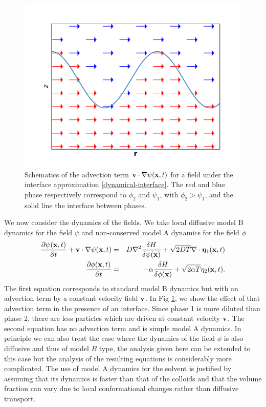 \begin{figure}
    \centering
    \includegraphics[width=0.7\linewidth]{drivenC/driven.pdf}
    \caption{Schematics of the advection term ${\bf v}\cdot { \nabla}\psi({\bf x},t)$ for a field under the interface approximation \eqref{dynamical-interface}. The red and blue phase respectively correspond to $\phi_2$ and $\psi_1$, with $\phi_2 \greater \psi_1$, and the solid line the interface between phases.}
    \label{fig-driven}    
\end{figure}

We now consider the dynamics of the fields. We take local diffusive model B dynamics for the field $\psi$ and non-conserved model A dynamics for the field $\phi$
\begin{eqnarray}
\frac{\partial \psi({\bf x},t)}{\partial t} +{\bf v}\cdot { \nabla}\psi({\bf x},t)&=& D\nabla^2\frac{\delta H}{\delta \psi({\bf x})}+ \sqrt{2D T}\nabla \cdot {\bm \eta}_1({\bf x},t) \\
\frac{\partial \phi({\bf x},t)}{\partial t} &=& -\alpha\frac{\delta H}{\delta \phi({\bf x})}+ \sqrt{2\alpha T}{ \eta}_2({\bf x},t).
\end{eqnarray}
The first equation corresponds to standard model B dynamics but with an advection term by a constant velocity field $\bf v$. 
{\color{red} In Fig \ref{fig-driven}, we show the effect of that advection term in the presence of an interface. Since phase 1 is more diluted than phase 2, there are less particles which are driven at constant velocity ${\bf v}$.}
The second equation has no advection term and is simple model A dynamics. In principle we can also treat the case where the dynamics of the field $\phi$ is also diffusive and thus of model $B$ type, the analysis given here can be extended to this case but the analysis of the resulting equations is considerably more complicated. The use of model A dynamics for the solvent is justified by assuming that its dynamics is faster than that of the colloids and that the volume fraction can vary due to local conformational changes rather than  diffusive transport.

